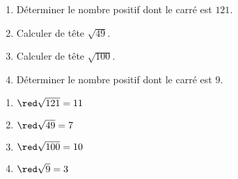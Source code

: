 \begin{exercice*}
    \begin{enumerate}
        \item Déterminer le nombre positif dont le carré est $121$.
        \item Calculer de tête $\sqrt{49}$.
        \item Calculer de tête $\sqrt{100}$.
        \item Déterminer le nombre positif dont le carré est $9$.
    \end{enumerate}
\end{exercice*}
\begin{corrige}
    \phantom{rrr}

    \begin{multicols}{2}
        \begin{enumerate}
            \item ${\red\sqrt{121}=11}$
            \item ${\red\sqrt{49}=7}$
            \item ${\red\sqrt{100}=10}$
            \item ${\red\sqrt{9}=3}$
        \end{enumerate}
    \end{multicols}
\end{corrige}

